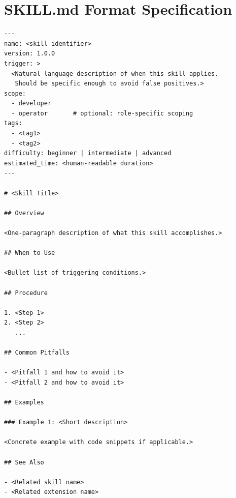 \section{SKILL.md Format Specification}

\label{app:skill-format}

\begin{verbatim}
---
name: <skill-identifier>
version: 1.0.0
trigger: >
  <Natural language description of when this skill applies.
   Should be specific enough to avoid false positives.>
scope:
  - developer
  - operator       # optional: role-specific scoping
tags:
  - <tag1>
  - <tag2>
difficulty: beginner | intermediate | advanced
estimated_time: <human-readable duration>
---

# <Skill Title>

## Overview

<One-paragraph description of what this skill accomplishes.>

## When to Use

<Bullet list of triggering conditions.>

## Procedure

1. <Step 1>
2. <Step 2>
   ...

## Common Pitfalls

- <Pitfall 1 and how to avoid it>
- <Pitfall 2 and how to avoid it>

## Examples

### Example 1: <Short description>

<Concrete example with code snippets if applicable.>

## See Also

- <Related skill name>
- <Related extension name>
\end{verbatim}

